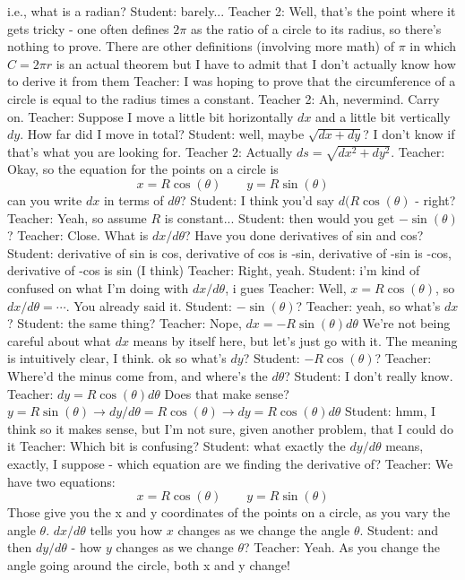 i.e., what is a radian?
Student: barely...
Teacher 2: Well, that's the point where it gets tricky - one often defines $2\pi$ as the ratio of a circle to its radius, so there's nothing to prove.
There are other definitions (involving more math) of $\pi$ in which $C = 2\pi r$ is an actual theorem but I have to admit that I don't actually know how to derive it from them
Teacher: I was hoping to prove that the circumference of a circle is equal to the radius times a constant.
Teacher 2: Ah, nevermind. Carry on.
Teacher: Suppose I move a little bit horizontally $dx$ and a little bit vertically $dy$.
How far did I move in total?
Student: well, maybe $\sqrt{dx + dy}$? I don't know if that's what you are looking for.
Teacher 2: Actually $ds=\sqrt{dx^2+dy^2}$.
Teacher: Okay, so the equation for the points on a circle is $$x = R \cos(\theta) \qquad y = R \sin(\theta)$$
 can you write $dx$ in terms of $d\theta$?
Student:  I think you'd say $d(R \cos(\theta)$ - right?
Teacher: Yeah, so assume $R$ is constant...
Student: then would you get $-\sin(\theta)$?
Teacher: Close. What is $dx / d\theta$? Have you done derivatives of sin and cos?
Student: derivative of sin is cos, derivative of cos is -sin, derivative of -sin is -cos, derivative of -cos is sin (I think)
Teacher: Right, yeah. 
Student: i'm kind of confused on what I'm doing with $dx/d\theta$, i gues
Teacher: Well, $x = R \cos(\theta)$, so $dx/d\theta = \cdots$. You already said it.
Student: $-\sin(\theta)$?
Teacher: yeah, so what's $dx$?
Student: the same thing?
Teacher: Nope, $dx = - R \sin(\theta) d\theta$
We're not being careful about what $dx$ means by itself here, but let's just go with it.
The meaning is intuitively clear, I think.
ok so what's $dy$?
Student: $-R\cos(\theta)$?
Teacher: Where'd the minus come from, and where's the $d\theta$?
Student: I don't really know.
Teacher: $dy = R \cos(\theta) d\theta$
Does that make sense?
$y = R \sin(\theta) \rightarrow dy/d\theta = R \cos(\theta) \rightarrow dy = R \cos(\theta) d\theta$
Student: hmm, I think so
it makes sense, but I'm not sure, given another problem, that I could do it
Teacher: Which bit is confusing?
Student: what exactly the $dy/d\theta$ means, exactly, I suppose - which equation are we finding the derivative of?
Teacher: We have two equations: $$x = R \cos(\theta) \qquad y = R \sin(\theta)$$
Those give you the x and y coordinates of the points on a circle, as you vary the angle $\theta$.
$dx/d\theta$ tells you how $x$ changes as we change the angle $\theta$.
Student: and then $dy/d\theta$ - how $y$ changes as we change $\theta$?
Teacher: Yeah. As you change the angle going around the circle, both x and y change!
